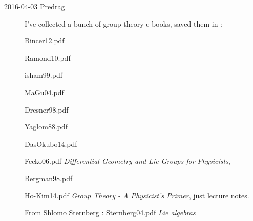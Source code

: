 \begin{description}
\item[2016-04-03 Predrag] I've collected a bunch of group theory e-books,
saved them in :

Bincer12.pdf

Ramond10.pdf

isham99.pdf

MaGu04.pdf

Dresner98.pdf

Yaglom88.pdf

DasOkubo14.pdf

Fecko06.pdf
{\em Differential Geometry and Lie Groups for Physicists},

Bergman98.pdf

{Ho-Kim14.pdf} {\em  Group Theory - A Physicist's Primer}, just lecture
notes.

From Shlomo Sternberg
:
Sternberg04.pdf {\em Lie algebras}


\end{description}


\printbibliography[heading=subbibintoc,title={References}]
